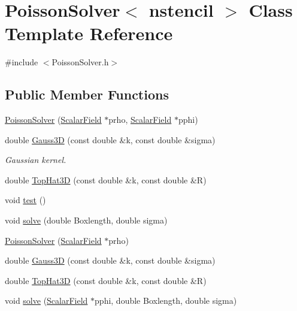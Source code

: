 \section{PoissonSolver$<$ nstencil $>$ Class Template Reference}
\label{classPoissonSolver}


{\ttfamily \#include $<$PoissonSolver.h$>$}

\subsection*{Public Member Functions}
\begin{DoxyCompactItemize}
\item 
\hyperlink{classPoissonSolver_a7ddd43d24b62636d55f26332b5d34dbc}{PoissonSolver} (\hyperlink{classScalarField}{ScalarField} $\ast$prho, \hyperlink{classScalarField}{ScalarField} $\ast$pphi)
\item 
double \hyperlink{classPoissonSolver_ae2e90b5bf9b5fc2069a3cafc17471714}{Gauss3D} (const double \&k, const double \&sigma)
\begin{DoxyCompactList}\small\item\em Gaussian kernel. \item\end{DoxyCompactList}\item 
double \hyperlink{classPoissonSolver_a291b425d9549b3cede155db6780e0566}{TopHat3D} (const double \&k, const double \&R)
\item 
void \hyperlink{classPoissonSolver_a403a4e00c0fbb7bcce4c1a55eb5414c9}{test} ()
\item 
void \hyperlink{classPoissonSolver_abb577e8f1d0e33f07aa330a50462dcb4}{solve} (double Boxlength, double sigma)
\item 
\hyperlink{classPoissonSolver_a238d58c904311240b50b03d872d42cf8}{PoissonSolver} (\hyperlink{classScalarField}{ScalarField} $\ast$prho)
\item 
double \hyperlink{classPoissonSolver_ae2e90b5bf9b5fc2069a3cafc17471714}{Gauss3D} (const double \&k, const double \&sigma)
\item 
double \hyperlink{classPoissonSolver_a291b425d9549b3cede155db6780e0566}{TopHat3D} (const double \&k, const double \&R)
\item 
void \hyperlink{classPoissonSolver_a2582095d916f844e0b7af838536e695b}{solve} (\hyperlink{classScalarField}{ScalarField} $\ast$pphi, double Boxlength, double sigma)
\end{DoxyCompactItemize}
